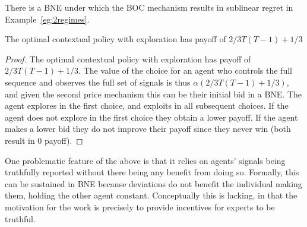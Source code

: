 \begin{prop}
There is a BNE under which the BOC mechanism results in sublinear regret in Example~\ref{eg:2regimes}. 
\end{prop}

The optimal contextual policy with exploration has payoff of $2/3T(T-1) + 1/3$

\begin{proof}
The optimal contextual policy with exploration has payoff of $2/3T(T-1) + 1/3$. The value of the choice for an agent who controls the full sequence and observes the full set of signals is thus $\alpha (2/3T(T-1) + 1/3)$, and given the second price mechanism this can be their initial bid in a BNE. The agent explores in the first choice, and exploits in all subsequent choices. If the agent does not explore in the first choice they obtain a lower payoff. If the agent makes a lower bid they do not improve their payoff since they never win (both result in 0 payoff).
\end{proof}


One problematic feature of the above is that it relies on agents' signals being truthfully reported without there being any benefit from doing so. Formally, this can be sustained in BNE because deviations do not benefit the individual making them, holding the other agent constant. Conceptually this is lacking, in that the motivation for the work is precisely to provide incentives for experts to be truthful.










